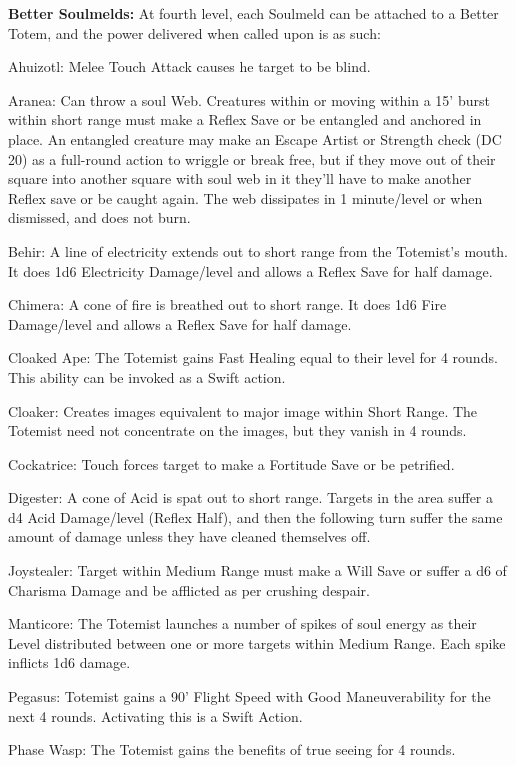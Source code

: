 \textbf{Better Soulmelds:} At fourth level, each Soulmeld can be attached to a Better Totem, and the power delivered when called upon is as such: 
\begin{itemize*}
\item Ahuizotl: Melee Touch Attack causes he target to be blind. 
\item Aranea: Can throw a soul Web. Creatures within or moving within a 15' burst within short range must make a Reflex Save or be entangled and anchored in place. An entangled creature may make an Escape Artist or Strength check (DC 20) as a full-round action to wriggle or break free, but if they move out of their square into another square with soul web in it they'll have to make another Reflex save or be caught again. The web dissipates in 1 minute/level or when dismissed, and does not burn. 
\item Behir: A line of electricity extends out to short range from the Totemist's mouth. It does 1d6 Electricity Damage/level and allows a Reflex Save for half damage. 
\item Chimera: A cone of fire is breathed out to short range. It does 1d6 Fire Damage/level and allows a Reflex Save for half damage. 
\item Cloaked Ape: The Totemist gains Fast Healing equal to their level for 4 rounds. This ability can be invoked as a Swift action. 
\item Cloaker: Creates images equivalent to major image within Short Range. The Totemist need not concentrate on the images, but they vanish in 4 rounds. 
\item Cockatrice: Touch forces target to make a Fortitude Save or be petrified. 
\item Digester: A cone of Acid is spat out to short range. Targets in the area suffer a d4 Acid Damage/level (Reflex Half), and then the following turn suffer the same amount of damage unless they have cleaned themselves off. 
\item Joystealer: Target within Medium Range must make a Will Save or suffer a d6 of Charisma Damage and be afflicted as per crushing despair. 
\item Manticore: The Totemist launches a number of spikes of soul energy as their Level distributed between one or more targets within Medium Range. Each spike inflicts 1d6 damage. 
\item Pegasus: Totemist gains a 90' Flight Speed with Good Maneuverability for the next 4 rounds. Activating this is a Swift Action. 
\item Phase Wasp: The Totemist gains the benefits of true seeing for 4 rounds. 

\end{itemize*}
